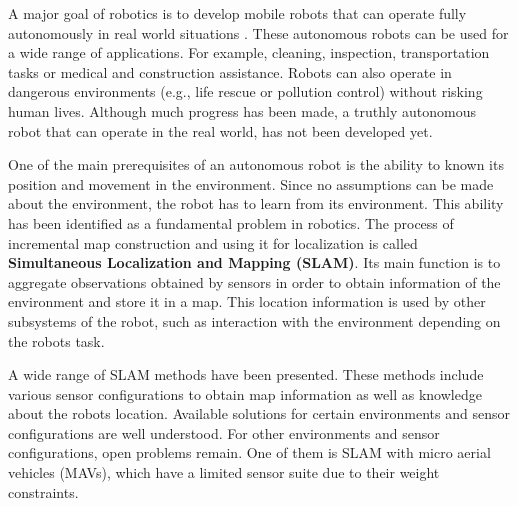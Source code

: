 A major goal of robotics is to develop mobile robots that can operate fully autonomously in real world situations \cite{murphy2000introduction}.
These autonomous robots can be used for a wide range of applications.
For example, cleaning, inspection, transportation tasks or medical and construction assistance.
Robots can also operate in dangerous environments (e.g., life rescue or pollution control) without risking human lives.
Although much progress has been made, a truthly autonomous robot that can operate in the real world, has not been developed yet.

One of the main prerequisites of an autonomous robot is the ability to known its position and movement in the environment.
Since no assumptions can be made about the environment, the robot has to learn from its environment.
This ability has been identified as a fundamental problem in robotics.
The process of incremental map construction and using it for localization is called \textbf{Simultaneous Localization and Mapping (SLAM)}.
Its main function is to aggregate observations obtained by sensors in order to obtain information of the environment and store it in a map.
This location information is used by other subsystems of the robot, such as interaction with the environment depending on the robots task.

A wide range of SLAM methods have been presented.
These methods include various sensor configurations to obtain map information as well as knowledge about the robots location.
Available solutions for certain environments and sensor configurations are well understood.
For other environments and sensor configurations, open problems remain.
One of them is SLAM with micro aerial vehicles (MAVs), which have a limited sensor suite due to their weight constraints.

